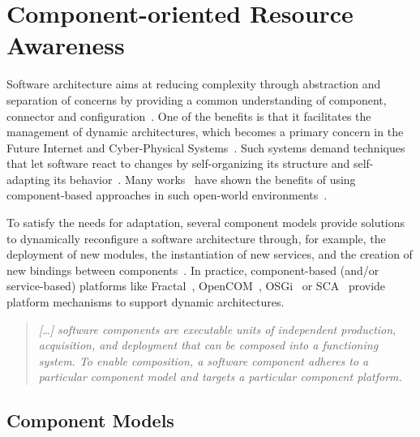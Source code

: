 \section{Component-oriented Resource Awareness} \label{sec:components-oriented-resource-awareness}

Software architecture aims at reducing complexity through abstraction and separation of concerns by providing a common understanding of component, connector and configuration~\cite{xadl,Medvidovic:2000,VanOmmering-et-al-00}.
One of the benefits is that it facilitates the management of dynamic architectures, which becomes a primary concern in the Future Internet and Cyber-Physical Systems~\cite{DBLP:journals/ase/NittoGMPP08, Johnson:2015:CSM:2735960.2735979}.
Such systems demand techniques that let software react to changes by self-organizing its structure and self-adapting its behavior~\cite{PanzicaLaManna:2012:LDU:2304736.2304764, Johnson:2015:CSM:2735960.2735979, Zhang:2009:MVD:1509239.1509262}.
Many works~\cite{cbse-conference} have shown the benefits of using component-based approaches in such open-world environments~\cite{baresi2006toward, Caporuscio:2010:AIA:1985522.1985547, Perez-Palacin:2010:PAO:1712605.1712614}.

To satisfy the needs for adaptation, several component models provide solutions to dynamically reconfigure a software architecture through, for example, the deployment of new modules, the instantiation of new services, and the creation of new bindings between components~\cite{Porter:2014:RMC:2602458.2602471, Zheng:2014:RCC:2679601.2680405, Irmert:2008:RAS:1370018.1370036, Ghezzi:2010:QDD:2163764.2163774}. 
In practice, component-based (and/or service-based) platforms like Fractal~\cite{bruneton06}, OpenCOM~\cite{BlairCULJ04}, OSGi~\cite{OSGI:r5} or SCA~\cite{SEINTURIER:2011:INRIA-00567442:1} provide platform mechanisms to support dynamic architectures.


\begin{quote}
\textit{[\dots] software components are executable units of independent production, 
acquisition, and deployment that can be composed into a functioning system.
To enable composition, a software component adheres to a particular component
model and targets a particular component platform.
}
\end{quote}

\subsection{Component Models}
